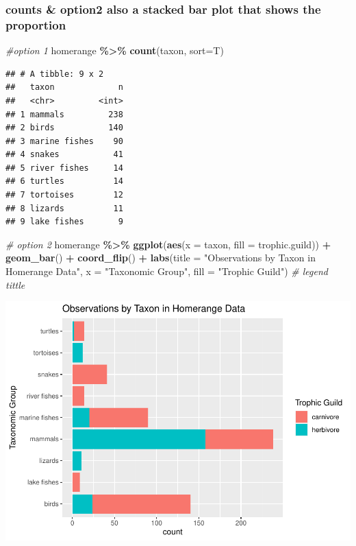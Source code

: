 \documentclass[
]{article}
\newenvironment{Shaded}{\begin{snugshade}}{\end{snugshade}}
\newcommand{\AttributeTok}[1]{\textcolor[rgb]{0.13,0.29,0.53}{#1}}
\newcommand{\CommentTok}[1]{\textcolor[rgb]{0.56,0.35,0.01}{\textit{#1}}}
\newcommand{\FunctionTok}[1]{\textcolor[rgb]{0.13,0.29,0.53}{\textbf{#1}}}
\newcommand{\NormalTok}[1]{#1}
\newcommand{\SpecialCharTok}[1]{\textcolor[rgb]{0.81,0.36,0.00}{\textbf{#1}}}
\newcommand{\StringTok}[1]{\textcolor[rgb]{0.31,0.60,0.02}{#1}}
\begin{document}
\hypertarget{counts-option2-also-a-stacked-bar-plot-that-shows-the-proportion}{%
\subsubsection{counts \& option2 also a stacked bar plot that shows the
proportion}\label{counts-option2-also-a-stacked-bar-plot-that-shows-the-proportion}}

\begin{Shaded}
\begin{Highlighting}[]
\CommentTok{\#option 1}
\NormalTok{homerange }\SpecialCharTok{\%\textgreater{}\%} \FunctionTok{count}\NormalTok{(taxon, }\AttributeTok{sort=}\NormalTok{T)}
\end{Highlighting}
\end{Shaded}

\begin{verbatim}
## # A tibble: 9 x 2
##   taxon             n
##   <chr>         <int>
## 1 mammals         238
## 2 birds           140
## 3 marine fishes    90
## 4 snakes           41
## 5 river fishes     14
## 6 turtles          14
## 7 tortoises        12
## 8 lizards          11
## 9 lake fishes       9
\end{verbatim}

\begin{Shaded}
\begin{Highlighting}[]
\CommentTok{\# option 2}
\NormalTok{homerange }\SpecialCharTok{\%\textgreater{}\%} 
  \FunctionTok{ggplot}\NormalTok{(}\FunctionTok{aes}\NormalTok{(}\AttributeTok{x =}\NormalTok{ taxon, }\AttributeTok{fill =}\NormalTok{ trophic.guild)) }\SpecialCharTok{+} 
  \FunctionTok{geom\_bar}\NormalTok{() }\SpecialCharTok{+}
  \FunctionTok{coord\_flip}\NormalTok{() }\SpecialCharTok{+}
  \FunctionTok{labs}\NormalTok{(}\AttributeTok{title =} \StringTok{"Observations by Taxon in Homerange Data"}\NormalTok{,}
       \AttributeTok{x =} \StringTok{"Taxonomic Group"}\NormalTok{,}
       \AttributeTok{fill =} \StringTok{"Trophic Guild"}\NormalTok{) }\CommentTok{\# legend tittle }
\end{Highlighting}
\end{Shaded}

\includegraphics{Untitled_files/figure-latex/unnamed-chunk-30-1.pdf}
\end{document}
